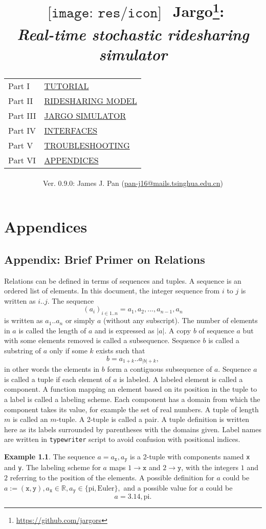 \documentclass{report}
\title{
  $
  \begin{array}{l}
  \texttt{[image: res/icon]}
  \end{array}
  $
  Jargo\footnote{\url{https://github.com/jargors}}:\\
  \large{\textbf{\textit{Real-time stochastic ridesharing simulator}}}\\
  \vspace{2em}
  {
    \small
    \begin{tabular}{lp{.6\textwidth}}
    \toprule
    Part I  &\hyperref[part-tutorial]{\textsc{TUTORIAL}}\\
    Part II &\hyperref[part-model]{\textsc{RIDESHARING MODEL}}\\
    Part III&\hyperref[part-simulator]{\textsc{JARGO SIMULATOR}}\\
    Part IV &\hyperref[part-interfaces]{\textsc{INTERFACES}}\\
    Part V  &\hyperref[part-troubleshooting]{\textsc{TROUBLESHOOTING}}\\
    Part VI &\hyperref[part-appendices]{\textsc{APPENDICES}}\\
    \bottomrule
    \end{tabular}
  }
}
\author{
  \small{Ver. 0.9.0: James J. Pan (\href{mailto:pan-j16@mails.tsinghua.edu.cn}{pan-j16@mails.tsinghua.edu.cn})}
}
\theoremstyle{definition}                   %
\newtheorem{example}{Example}
\begin{document}
\maketitle
\pagestyle{noweb}

\renewcommand{\thepage}{\roman{page}}
\setcounter{page}{1}

\tableofcontents



\part{Appendices}
\label{part-appendices}

\appendix

\chapter{Appendix: Brief Primer on Relations}
\label{ap-primer}

Relations can be defined in terms of sequences and tuples.  A sequence is an
ordered list of elements.  In this document, the integer sequence from $i$ to
$j$ is written as $i..j$. The sequence $$(a_i)_{i\in
1..n}=a_1,a_2,...,a_{n-1},a_n$$ is written as $a_1..a_n$ or simply $a$ (without
any subscript). The number of elements in $a$ is called the length of $a$ and
is expressed as $|a|$.  A copy $b$ of sequence $a$ but with some elements
removed is called a subsequence.  Sequence $b$ is called a substring of $a$
only if some $k$ exists such that $$b=a_{1+k}..a_{|b|+k},$$ in other words the
elements in $b$ form a contiguous subsequence of $a$.  Sequence $a$ is called a
tuple if each element of $a$ is labeled. A labeled element is called a
component.  A function mapping an element based on its position in the tuple to
a label is called a labeling scheme.  Each component has a domain from which
the component takes its value, for example the set of real numbers.  A tuple of
length $m$ is called an $m$-tuple. A 2-tuple is called a pair.  A tuple
definition is written here as its labels surrounded by parentheses with the
domains given. Label names are written in \texttt{typewriter} script to avoid
confusion with positional indices.

\begin{example}
\label{ex:tuple}
The sequence $a=a_\texttt{x},a_\texttt{y}$ is a 2-tuple with components named
\texttt{x} and \texttt{y}.  The labeling scheme for $a$ maps $1\rightarrow
\texttt{x}$ and $2\rightarrow \texttt{y}$, with the integers $1$ and $2$
referring to the position of the elements. A possible definition for $a$ could
be $a:=(\texttt{x},\texttt{y}), a_\texttt{x}\in\mathbb{R},
a_\texttt{y}\in\{\textrm{pi},\textrm{Euler}\},$ and a possible value for $a$
could be $$a=3.14,\textrm{pi}.$$
\end{example}
\end{document}
